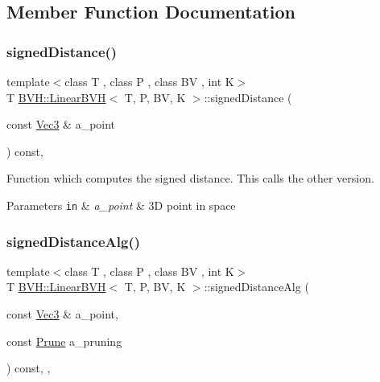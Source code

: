\subsection{Member Function Documentation}
\mbox{\label{classBVH_1_1LinearBVH_a8fb0c0cb9e8f5161ed78953237eb3c39}} 
\subsubsection{\texorpdfstring{signed\+Distance()}{signedDistance()}}
{\footnotesize\ttfamily template$<$class T , class P , class BV , int K$>$ \\
T \hyperlink{classBVH_1_1LinearBVH}{B\+V\+H\+::\+Linear\+B\+VH}$<$ T, P, BV, K $>$\+::signed\+Distance (\begin{DoxyParamCaption}\item[{const \hyperlink{classBVH_1_1LinearBVH_a13b0083e8b7ff1a5e170d39d69e6a15a}{Vec3} \&}]{a\+\_\+point }\end{DoxyParamCaption}) const\hspace{0.3cm}{\ttfamily [inline]}, {\ttfamily [noexcept]}}



Function which computes the signed distance. This calls the other version. 


\begin{DoxyParams}[1]{Parameters}
\mbox{\tt in}  & {\em a\+\_\+point} & 3D point in space \\
\hline
\end{DoxyParams}
\mbox{\label{classBVH_1_1LinearBVH_a9eef70c91c5ba2608721ff3e3cb2cf56}} 
\subsubsection{\texorpdfstring{signed\+Distance\+Alg()}{signedDistanceAlg()}}
{\footnotesize\ttfamily template$<$class T , class P , class BV , int K$>$ \\
T \hyperlink{classBVH_1_1LinearBVH}{B\+V\+H\+::\+Linear\+B\+VH}$<$ T, P, BV, K $>$\+::signed\+Distance\+Alg (\begin{DoxyParamCaption}\item[{const \hyperlink{classBVH_1_1LinearBVH_a13b0083e8b7ff1a5e170d39d69e6a15a}{Vec3} \&}]{a\+\_\+point,  }\item[{const \hyperlink{namespaceBVH_a3ddb7b34ac1deb3baed2f32d9eacbe5b}{Prune}}]{a\+\_\+pruning }\end{DoxyParamCaption}) const\hspace{0.3cm}{\ttfamily [inline]}, {\ttfamily [protected]}, {\ttfamily [noexcept]}}



